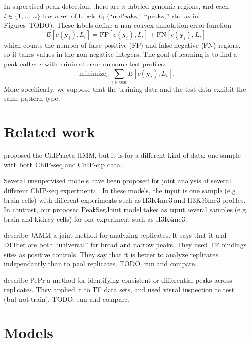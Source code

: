 \documentclass{article} %
\DeclareMathOperator*{\minimize}{minimize}
\begin{document}
In supervised peak detection, there are $n$ labeled genomic regions,
and each $i\in\{1, \dots, n\}$ has a set of labels $L_i$ (``noPeaks,''
``peaks,'' etc. as in Figures~TODO). These labels define a non-convex
annotation error function
\begin{equation}
  \label{eq:error}
  E[c(\mathbf y_i),  L_i] =
  \text{FP}[c(\mathbf y_i), L_i] +
  \text{FN}[c(\mathbf y_i), L_i]
\end{equation}
which counts the number of false positive (FP) and false negative (FN)
regions, so it takes values in the non-negative integers. The goal of
learning is to find a peak caller~$c$ with minimal error on some test
profiles:
\begin{equation}
  \label{eq:min_error}
  \minimize_c \sum_{i\in\text{test}} E[c(\mathbf y_i),  L_i].
\end{equation}
More specifically, we suppose that the training data and the test data
exhibit the same pattern type.
\section{Related work}

\citet{hierarchical-joint} proposed the ChIPmeta HMM, but it is for a
different kind of data: one sample with both ChIP-seq and ChIP-cip
data.

Several unsupervised models have been proposed for joint analysis of
several different ChIP-seq experiments
\citep{jmosaics,segway,chromhmm}. In these models, the input is one
sample (e.g. brain cells) with different experiments such as H3K4me3
and H3K36me3 profiles. In contrast, our proposed PeakSegJoint model
takes as input several samples (e.g. brain and kidney cells) for one
experiment such as H3K4me3.

\citet{JAMM} describe JAMM a joint method for analyzing replicates. It
says that it and DFilter are both ``universal'' for broad and narrow
peaks. They used TF bindings sites as positive controls. They say that
it is better to analyze replicates independantly than to pool
replicates. TODO: run and compare.


\citet{PePr} describe PePr a method for identifying consistent or
differential peaks across replicates. They applied it to TF data sets,
and used visual inspection to test (but not train). TODO: run and
compare.

\section{Models}
\end{document}
